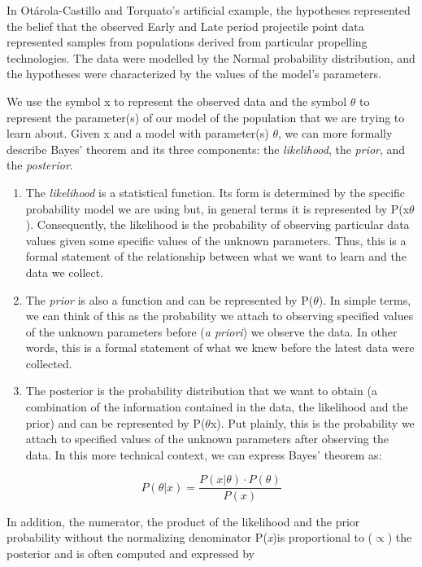 \documentclass[
]{article}
\begin{document}
In Otárola-Castillo and Torquato's artificial example, the hypotheses
represented the belief that the observed Early and Late period
projectile point data represented samples from populations derived from
particular propelling technologies. The data were modelled by the Normal
probability distribution, and the hypotheses were characterized by the
values of the model's parameters.

We use the symbol x to represent the observed data and the symbol
\(\theta\) to represent the parameter(s) of our model of the population
that we are trying to learn about. Given x and a model with parameter(s)
\(\theta\), we can more formally describe Bayes' theorem and its three
components: the \emph{likelihood}, the \emph{prior}, and the
\emph{posterior}.

\begin{enumerate}
\def\labelenumi{\roman{enumi}.}
\item
  The \emph{likelihood} is a statistical function. Its form is
  determined by the specific probability model we are using but, in
  general terms it is represented by P(x\textbar{}\(\theta\)).
  Consequently, the likelihood is the probability of observing
  particular data values given some specific values of the unknown
  parameters. Thus, this is a formal statement of the relationship
  between what we want to learn and the data we collect.
\item
  The \emph{prior} is also a function and can be represented by
  P(\(\theta\)). In simple terms, we can think of this as the
  probability we attach to observing specified values of the unknown
  parameters before (\emph{a priori}) we observe the data. In other
  words, this is a formal statement of what we knew before the latest
  data were collected.
\item
  The posterior is the probability distribution that we want to obtain
  (a combination of the information contained in the data, the
  likelihood and the prior) and can be represented by
  P(\(\theta\)\textbar x). Put plainly, this is the probability we
  attach to specified values of the unknown parameters after observing
  the data. In this more technical context, we can express Bayes'
  theorem as:
\end{enumerate}

\begin{equation}
P(\theta|x) = \frac{P(x|\theta)\cdot P(\theta)}{P(x)}
\label{eg:5}
\end{equation}

In addition, the numerator, the product of the likelihood and the prior
probability without the normalizing denominator P(\emph{x})is
proportional to (\(\propto\)) the posterior and is often computed and
expressed by
\end{document}

